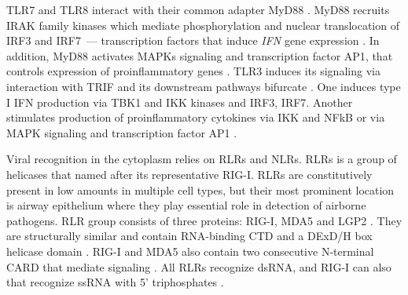 		
				
		TLR7 and TLR8 interact with their common adapter MyD88 \parencite{Medzhitov1998}. MyD88 recruits IRAK family kinases which mediate phosphorylation and nuclear translocation of \gls{IRF}3 and \gls{IRF}7~--- transcription factors that induce \textit{\gls{IFN}} gene expression \parencite{Burns2003, Honda2005a}. In addition, MyD88 activates \glspl{MAPK} signaling and transcription factor \gls{AP1}, that controls expression of proinflammatory genes \parencite{Kawai2007}. TLR3 induces its signaling via interaction with \gls{TRIF} and its downstream pathways bifurcate \parencite{Guillot2005, Kumar2009}. One induces type I \gls{IFN} production via TBK1 and \gls{IKK} kinases and \gls{IRF}3, \gls{IRF}7. Another stimulates production of proinflammatory cytokines via \gls{IKK} and \gls{NFkB} or via \gls{MAPK} signaling and transcription factor \gls{AP1} \parencite{Guillot2005, Vercammen2008}.  
		 
		Viral recognition in the cytoplasm relies on \glspl{RLR} and \glspl{NLR}.
		\glspl{RLR} is a group of helicases that named after its representative \gls{RIG-I}. \glspl{RLR} are constitutively present in low amounts in multiple cell types, but their most prominent location is airway epithelium \parencite{Bogefors2011} where they play essential role in detection of airborne pathogens. \gls{RLR} group consists of three proteins: \gls{RIG-I}, \gls{MDA5} and \gls{LGP2} \parencite{Kang2004, Yoneyama2004, Yoneyama2005}. They are structurally similar and contain RNA-binding \gls{CTD} and a DExD/H box helicase domain \parencite{Cui2008, Takahasi2009}. \gls{RIG-I} and \gls{MDA5} also contain two consecutive N-terminal \gls{CARD} that mediate signaling \parencite{Yoneyama2004, Kang2004}. All \gls{RLR}s recognize dsRNA, and \gls{RIG-I} can also that recognize ssRNA with 5' triphosphates \parencite{Cui2008}. 
		

